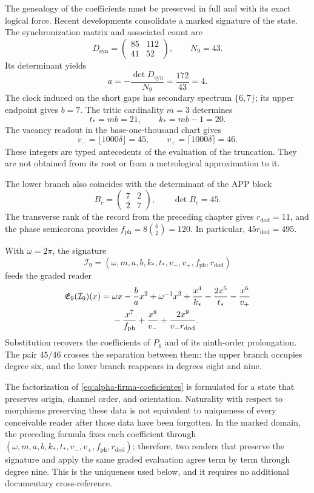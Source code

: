 The genealogy of the coefficients must be preserved in full and with its
exact logical force. Recent developments consolidate a marked signature of
the state. The synchronization matrix and associated count are
\[
 D_{\mathrm{syn}}=\begin{pmatrix}85&112\\41&52\end{pmatrix},
 \qquad N_9=43.
\]
Its determinant yields
\[
 a=-\frac{\det D_{\mathrm{syn}}}{N_9}
   =\frac{172}{43}=4.
\]
The clock induced on the short gaps has secondary spectrum \(\{6,7\}\); its
upper endpoint gives \(b=7\). The tritic cardinality \(m=3\) determines
\[
 t_*=mb=21,\qquad k_*=mb-1=20.
\]
The vacancy readout in the base-one-thousand chart gives
\[
 v_-=\lfloor1000\delta\rfloor=45,\qquad
 v_+=\lceil1000\delta\rceil=46.
\]
These integers are typed antecedents of the evaluation of the truncation.
They are not obtained from its root or from a metrological approximation to
it.

The lower branch also coincides with the determinant of the APP block
\[
 B_c=\begin{pmatrix}7&2\\2&7\end{pmatrix},\qquad\det B_c=45.
\]
The transverse rank of the record from the preceding chapter gives
\(r_{\mathrm{dod}}=11\), and the phase semicorona provides
\(f_{\mathrm{ph}}=8\binom62=120\). In particular,
\(45r_{\mathrm{dod}}=495\).

With \(\omega=2\pi\), the signature
\[
 \mathcal I_9=(\omega,m,a,b,k_*,t_*,v_-,v_+,f_{\mathrm{ph}},r_{\mathrm{dod}})
\]
feeds the graded reader
\begin{align}
 \mathfrak E_9(\mathcal I_9)(x)
 ={}&\omega x-\frac ba x^2+\omega^{-1}x^3
 +\frac{x^4}{k_*}-\frac{2x^5}{t_*}-\frac{x^6}{v_+}\notag\\
 &-\frac{x^7}{f_{\mathrm{ph}}}+\frac{x^8}{v_-}
 +\frac{2x^9}{v_-r_{\mathrm{dod}}}.
 \label{eq:alpha-firma-coeficientes}
\end{align}
Substitution recovers the coefficients of \(P_6\) and of its ninth-order
prolongation. The pair \(45/46\) crosses the separation between them: the
upper branch occupies degree six, and the lower branch reappears in degrees
eight and nine.

The factorization of \eqref{eq:alpha-firma-coeficientes} is formulated for a
state that preserves origin, channel order, and orientation. Naturality with
respect to morphisms preserving these data is not equivalent to uniqueness of
every conceivable reader after those data have been forgotten. In the marked
domain, the preceding formula fixes each coefficient through
\((\omega,m,a,b,k_*,t_*,v_-,v_+,f_{\mathrm{ph}},r_{\mathrm{dod}})\);
therefore, two readers that preserve the signature and apply the same graded
evaluation agree term by term through degree nine. This is the uniqueness
used below, and it requires no additional documentary cross-reference.

